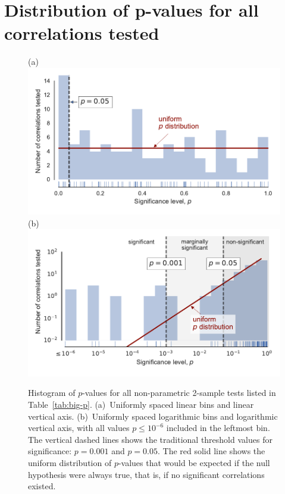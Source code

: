 \addtocounter{section}{-1}

\section{Distribution of p-values for all correlations tested}
\label{sec:distr-p-values}
\addtocounter{table}{1}


\begin{figure}
  (a)\\
  \includegraphics[width=\linewidth]{figs/p-value-histogram-new-linear}\\
  (b)\\
  \includegraphics[width=\linewidth]{figs/p-value-histogram-new}
  \caption{Histogram of \(p\)-values for all non-parametric 2-sample
    tests listed in Table~\ref{tab:big-p}. (a)~Uniformly spaced linear
    bins and linear vertical axis. (b)~Uniformly spaced logarithmic
    bins and logarithmic vertical axis, with all values
    \(p \le 10^{-6}\) included in the leftmost bin.  The vertical dashed
    lines shows the traditional threshold values for significance:
    \(p = 0.001\) and \(p = 0.05\). The red solid line shows the
    uniform distribution of \(p\)-values that would be expected if the
    null hypothesis were always true, that is, if no significant
    correlations existed.}
  \label{fig:histo-p-values}
\end{figure}


